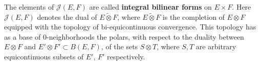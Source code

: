 The elements of $\mathcal{J}(E, F)$ are called \textbf{integral bilinear forms} on $E \times F$. Here $\mathcal{J}(E, F)$ denotes the dual of $E \tilde{\otimes} F$, where $E \tilde{\otimes} F$ is the completion of $E \otimes F$ equipped with the topology of bi-equicontinuous convergence. This topology has as a base of $0$-neighborhoods the polars, with respect to the duality between $E \otimes F$ and $E' \otimes F' \subset B(E, F)$, of the sets $S \otimes T$, where $S, T$ are arbitrary equicontinuous subsets of $E'$, $F'$ respectively.

